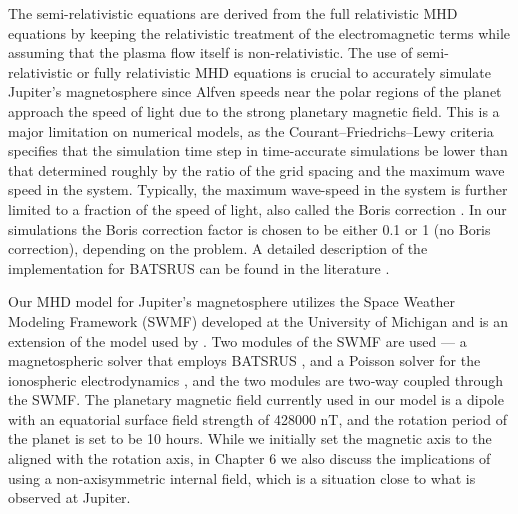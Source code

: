 The semi-relativistic equations are derived from the full relativistic MHD equations \cite{Gombosi2002b} by keeping the relativistic treatment of the electromagnetic terms while assuming that the plasma flow itself is non-relativistic. The use of semi-relativistic or fully relativistic MHD equations is crucial to accurately simulate Jupiter's magnetosphere since Alfven speeds near the polar regions of the planet approach the speed of light due to the strong planetary magnetic field. This is a major limitation on numerical models, as the Courant–Friedrichs–Lewy criteria specifies that the simulation time step in time-accurate simulations be lower than that determined roughly by the ratio of the grid spacing and the maximum wave speed in the system. Typically, the maximum wave-speed in the system is further limited to a fraction of the speed of light, also called the Boris correction \cite{Toth2011}. In our simulations the Boris correction factor is chosen to be either 0.1 or 1 (no Boris correction), depending on the problem. A detailed description of the implementation for BATSRUS can be found in the literature \cite{Gombosi2002b, Toth2012a}.

Our MHD model for Jupiter's magnetosphere utilizes the Space Weather Modeling Framework (SWMF) developed at the University of Michigan \cite{Toth2012a} and is an extension of the model used by \cite{Hansen2001a}. Two modules of the SWMF are used — a magnetospheric solver that employs BATSRUS \cite{Gombosi2002b,Powell1999a}, and a Poisson solver for the ionospheric electrodynamics \cite{Ridley2004IonosphericConductance}, and the two modules are two‐way coupled through the SWMF.  The planetary magnetic field currently used in our model is a dipole with an equatorial surface field strength of 428000 nT, and the rotation period of the planet is set to be 10 hours. While we initially set the magnetic axis to the aligned with the rotation axis, in Chapter 6 we also discuss the implications of using a non-axisymmetric internal field, which is a situation close to what is observed at Jupiter. 

